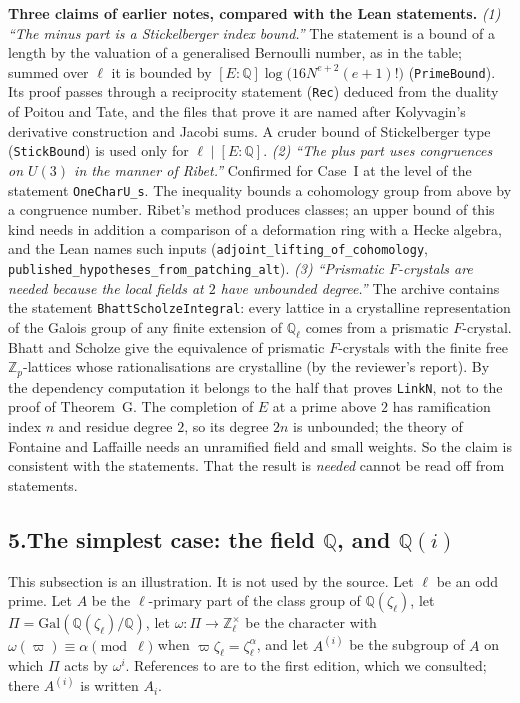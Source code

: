 \documentclass[11pt,letterpaper]{article}
\newcommand{\Z}{\mathbb Z}\newcommand{\Q}{\mathbb Q}\newcommand{\C}{\mathbb C}
\begin{document}
\textbf{Three claims of earlier notes, compared with the Lean statements.}
\emph{(1) ``The minus part is a Stickelberger index bound.''} The statement is a bound of a length by the
valuation of a generalised Bernoulli number, as in the table; summed over $\ell$ it is bounded by
$[E:\Q]\log\big(16N^{e+2}(e+1)!\big)$ (\texttt{PrimeBound}). Its proof passes through a reciprocity
statement (\texttt{Rec}) deduced from the duality of Poitou and Tate, and the files that prove it are named
after Kolyvagin's derivative construction and Jacobi sums. A cruder bound of Stickelberger type
(\texttt{StickBound}) is used only for $\ell\mid[E:\Q]$.
\emph{(2) ``The plus part uses congruences on $U(3)$ in the manner of Ribet.''} Confirmed for Case~I at the
level of the statement \texttt{OneCharU\_s}. The inequality bounds a cohomology group from above by a congruence
number. Ribet's method produces classes; an upper bound of this kind needs in addition a comparison of
a deformation ring with a Hecke algebra, and the Lean names such inputs (\texttt{adjoint\_lifting\_of\_cohomology},
\texttt{published\_hypotheses\_from\_patching\_alt}).
\emph{(3) ``Prismatic $F$-crystals are needed because the local fields at $2$ have unbounded degree.''}
The archive contains the statement \texttt{BhattScholzeIntegral}: every lattice in a crystalline
representation of the Galois group of any finite extension of $\Q_\ell$ comes from a prismatic $F$-crystal.
Bhatt and Scholze \cite[Thms.~1.2 and~5.6]{BS23} give the equivalence of prismatic $F$-crystals with the
finite free $\Z_p$-lattices whose rationalisations are crystalline (by the reviewer's report). By the dependency computation it belongs to the half that
proves \texttt{LinkN}, not to the proof of
Theorem~G. The completion of $E$ at a prime above $2$ has ramification index $n$ and
residue degree $2$, so its degree $2n$ is unbounded; the theory of Fontaine and Laffaille needs an
unramified field and small weights. So the claim is consistent with the statements. That the result is
\emph{needed} cannot be read off from statements.

\subsection*{5.\quad The simplest case: the field $\Q$, and $\Q(i)$}

This subsection is an illustration. It is not used by the source. Let $\ell$ be an odd prime. Let $A$ be the
$\ell$-primary part of the class group of $\Q(\zeta_\ell)$, let $\Pi=\mathrm{Gal}(\Q(\zeta_\ell)/\Q)$, let
$\omega\colon\Pi\to\Z_\ell^\times$ be the character with $\omega(\varpi)\equiv\alpha\pmod\ell$ when
$\varpi\zeta_\ell=\zeta_\ell^{\alpha}$, and let $A^{(i)}$ be the subgroup of $A$ on which $\Pi$ acts by
$\omega^{i}$. References to \cite{Was82} are to the first edition, which we consulted; there $A^{(i)}$ is
written $A_i$.
\end{document}

